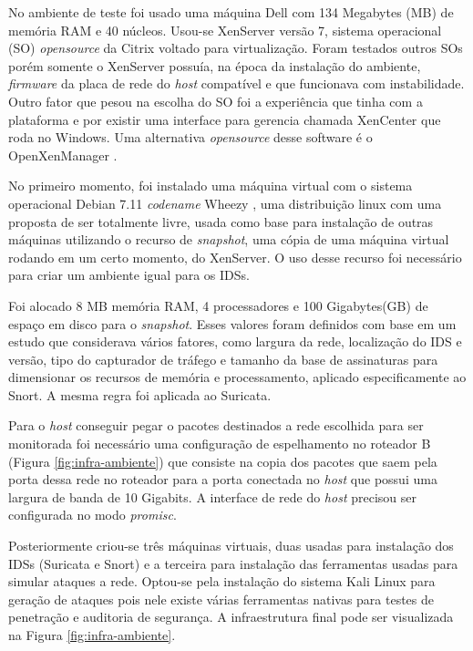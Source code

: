 \documentclass[
	12pt,				
	openright,		
	twoside,	
	a4paper,
	english,	
	brazil	
	]{abntex2}
\begin{document}
No ambiente de teste foi usado uma máquina Dell com 134 Megabytes (MB) de memória RAM e 40 núcleos. Usou-se XenServer \cite{xenserver} versão 7, sistema operacional (SO) \textit{opensource} da Citrix voltado para virtualização. Foram testados outros SOs porém somente o XenServer possuía, na época da instalação do ambiente, \textit{firmware} da placa de rede do \textit{host} compatível e que funcionava com instabilidade. Outro fator que pesou na escolha do SO foi a experiência que tinha com a plataforma e por existir uma interface para gerencia chamada XenCenter que roda no Windows. Uma alternativa \textit{opensource} desse software é o OpenXenManager \cite{openxenmanager}.

No primeiro momento, foi instalado uma máquina virtual com o sistema operacional Debian 7.11 \textit{codename} Wheezy \cite{debianwheezy}, uma distribuição linux com uma proposta de ser totalmente livre, usada como base para instalação de outras máquinas utilizando o recurso de \textit{snapshot}, uma cópia de uma máquina virtual rodando em um certo momento, do XenServer. O uso desse recurso foi necessário para criar um ambiente igual para os IDSs.

Foi alocado 8 MB memória RAM, 4 processadores e 100 Gigabytes(GB) de espaço em disco para o \textit{snapshot}. Esses valores foram definidos com base em um estudo \cite{mikelococo} que considerava vários fatores, como largura da rede, localização do IDS e versão, tipo do capturador de tráfego e tamanho da base de assinaturas para dimensionar os recursos de memória e processamento, aplicado especificamente ao Snort. A mesma regra foi aplicada ao Suricata.

Para o \textit{host} conseguir pegar o pacotes destinados a rede escolhida para ser monitorada foi necessário uma configuração de espelhamento no roteador B (Figura \ref{fig:infra-ambiente}) que consiste na copia dos pacotes que saem pela porta dessa rede no roteador para a porta conectada no \textit{host} que possui uma largura de banda de 10 Gigabits. A interface de rede do \textit{host} precisou ser configurada no modo \textit{promisc}.

Posteriormente criou-se três máquinas virtuais, duas usadas para instalação dos IDSs (Suricata e Snort) e a terceira para instalação das ferramentas usadas para simular ataques a rede. Optou-se pela instalação do sistema Kali Linux \cite{kalilinux} para geração de ataques pois nele existe várias ferramentas nativas para testes de penetração e auditoria de segurança. A infraestrutura final pode ser visualizada na Figura \ref{fig:infra-ambiente}.
\end{document}

